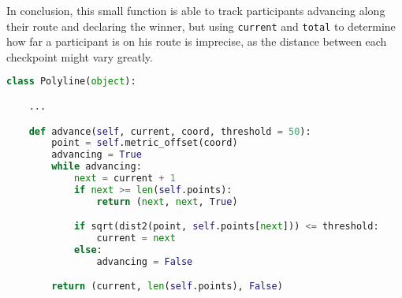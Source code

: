 In conclusion, this small function is able to track participants advancing along their route and declaring the winner, but using \texttt{current} and \texttt{total} to determine how far a participant is on his route is imprecise, as the distance between each checkpoint might vary greatly.

\begin{lstlisting}[label={lst:sprint4-polyline},caption={The Advance Function of Polyline},language={Python}]
class Polyline(object):

	...

	def advance(self, current, coord, threshold = 50):
		point = self.metric_offset(coord)
		advancing = True
		while advancing:
			next = current + 1
			if next >= len(self.points):
				return (next, next, True)

			if sqrt(dist2(point, self.points[next])) <= threshold:
				current = next
			else:
				advancing = False

		return (current, len(self.points), False)
\end{lstlisting}

